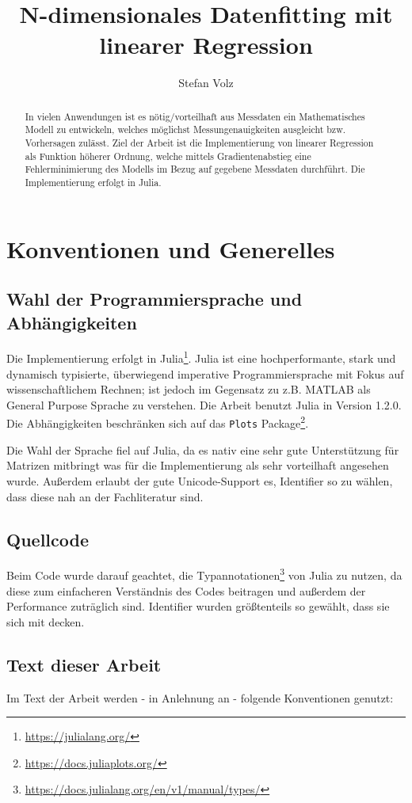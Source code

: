 \documentclass{article}
\title{ N-dimensionales Datenfitting mit linearer Regression  }
\author{
  Stefan Volz
}
\theoremstyle{plain} %
\theoremstyle{definition} %
\begin{document}
\begin{abstract}
  In vielen Anwendungen ist es nötig/vorteilhaft aus Messdaten ein Mathematisches Modell zu entwickeln, welches möglichst Messungenauigkeiten ausgleicht bzw. Vorhersagen zulässt. Ziel der Arbeit ist die Implementierung von linearer Regression als Funktion höherer Ordnung, welche mittels Gradientenabstieg eine Fehlerminimierung des Modells im Bezug auf gegebene Messdaten durchführt. Die Implementierung erfolgt in Julia.
\end{abstract}

\maketitle
\section{Konventionen und Generelles}
\subsection{Wahl der Programmiersprache und Abhängigkeiten}
Die Implementierung erfolgt in Julia\footnote{\url{https://julialang.org/}}. Julia ist eine hochperformante, stark und dynamisch typisierte, überwiegend imperative Programmiersprache mit Fokus auf wissenschaftlichem Rechnen; ist jedoch im Gegensatz zu z.B. MATLAB als General Purpose Sprache zu verstehen. Die Arbeit benutzt Julia in Version 1.2.0. Die Abhängigkeiten beschränken sich auf das \texttt{Plots} Package\footnote{\url{https://docs.juliaplots.org/}}.

Die Wahl der Sprache fiel auf Julia, da es nativ eine sehr gute Unterstützung für Matrizen mitbringt was für die Implementierung als sehr vorteilhaft angesehen wurde. Außerdem erlaubt der gute Unicode-Support es, Identifier so zu wählen, dass diese nah an der Fachliteratur sind.

\subsection{Quellcode}
Beim Code wurde darauf geachtet, die Typannotationen\footnote{\url{https://docs.julialang.org/en/v1/manual/types/}} von Julia zu nutzen, da diese zum einfacheren Verständnis des Codes beitragen und außerdem der Performance zuträglich sind.
Identifier wurden größtenteils so gewählt, dass sie sich mit \cite{Bishop} decken.

\subsection{Text dieser Arbeit}
Im Text der Arbeit werden - in Anlehnung an \cite{Bishop} - folgende Konventionen genutzt:
\end{document}
